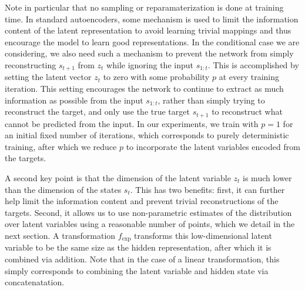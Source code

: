 \documentclass{article}
\begin{document}
Note in particular that no sampling or reparamaterization is done at training time.
In standard autoencoders, some mechanism is used to limit the information content of the latent representation to avoid learning trivial mappings and thus encourage the model to learn good representations.
In the conditional case we are considering, we also need such a mechanism to prevent the network from simply reconstructing $s_{t+1}$ from $z_t$ while ignoring the input $s_{1:t}$.
This is accomplished by setting the latent vector $z_t$ to zero with some probability $p$ at every training iteration.
This setting encourages the network to continue to extract as much information as possible from the input $s_{1:t}$, rather than simply trying to reconstruct the target, and only use the true target $s_{t+1}$ to reconstruct what cannot be predicted from the input.
In our experiments, we train with $p=1$ for an initial fixed number of iterations, which corresponds to purely deterministic training, after which we reduce $p$ to incorporate the latent variables encoded from the targets.

A second key point is that the dimension of the latent variable $z_t$ is much lower than the dimension of the states $s_t$. This has two benefits: first, it can further help limit the information content and prevent trivial reconstructions of the targets. Second, it allows us to use non-parametric estimates of the distribution over latent variables using a reasonable number of points, which we detail in the next section. A transformation $f_\text{exp}$ transforms this low-dimensional latent variable to be the same size as the hidden representation, after which it is combined via addition. Note that in the case of a linear transformation, this simply corresponds to combining the latent variable and hidden state via concatenatation.

\end{document}
